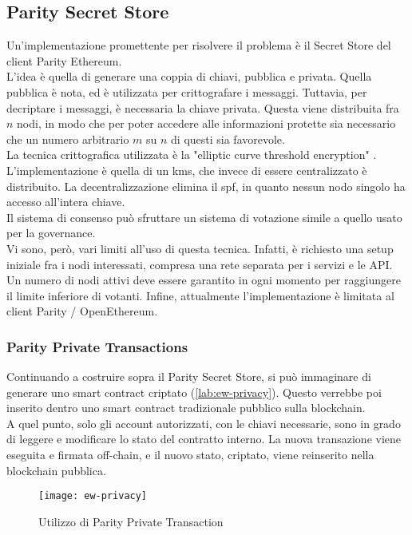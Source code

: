 \subsection{Parity Secret Store}
Un'implementazione promettente per risolvere il problema è il Secret Store del client Parity Ethereum. \\
L'idea è quella di generare una coppia di chiavi, pubblica e privata.
Quella pubblica è nota, ed è utilizzata per crittografare i messaggi.
Tuttavia, per decriptare i messaggi, è necessaria la chiave privata.
Questa viene distribuita fra $n$ nodi, in modo che per poter accedere alle informazioni protette sia necessario che un numero arbitrario $m$ su $n$ di questi sia favorevole. \\
La tecnica crittografica utilizzata è la "elliptic curve threshold encryption" \cite{art:ecdkg}. \\
L'implementazione è quella di un \gls{kms}, che invece di essere centralizzato è distribuito.
La decentralizzazione elimina il \gls{spf}, in quanto nessun nodo singolo ha accesso all'intera chiave. \\
Il sistema di consenso può sfruttare un sistema di votazione simile a quello usato per la governance. \\
Vi sono, però, vari limiti all'uso di questa tecnica.
Infatti, è richiesto una setup iniziale fra i nodi interessati, compresa una rete separata per i servizi e le API.
Un numero di nodi attivi deve essere garantito in ogni momento per raggiungere il limite inferiore di votanti.
Infine, attualmente l'implementazione è limitata al client Parity / OpenEthereum.

\subsubsection{Parity Private Transactions}
Continuando a costruire sopra il Parity Secret Store, si può immaginare di generare uno smart contract criptato (\autoref{lab:ew-privacy}).
Questo verrebbe poi inserito dentro uno smart contract tradizionale pubblico sulla blockchain. \\
A quel punto, solo gli account autorizzati, con le chiavi necessarie, sono in grado di leggere e modificare lo stato del contratto interno.
La nuova transazione viene eseguita e firmata off-chain, e il nuovo stato, criptato, viene reinserito nella blockchain pubblica.

\begin{figure}[ht]
    \texttt{[image: ew-privacy]}
    \centering
    \caption{Utilizzo di Parity Private Transaction \cite{img:ew-privacy}}
    \label{lab:ew-privacy}
\end{figure}

